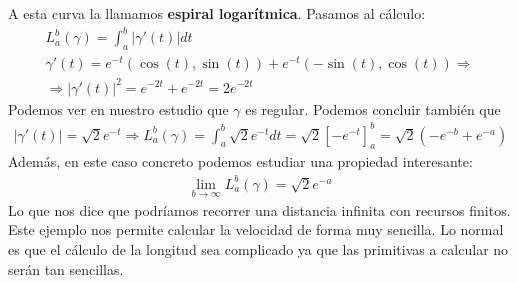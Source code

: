 \begin{ejemplo}
\begin{enumerate}
        A esta curva la llamamos \textbf{espiral logarítmica}. Pasamos al cálculo:
        \begin{gather*}
            L_a^b(\gamma) = \int_a^b |\gamma'(t)| dt\\
            \gamma'(t) = e^{-t}(\cos(t), \sin(t)) + e^{-t}(-\sin(t), \cos(t))\Rightarrow\\
            \Rightarrow |\gamma'(t)|^2 = e^{-2t}+e^{-2t} = 2e^{-2t}
        \end{gather*}
        Podemos ver en nuestro estudio que $\gamma$ es regular. Podemos concluir también que
        \begin{gather*}
            |\gamma'(t)| = \sqrt{2}e^{-t} \Rightarrow L_a^b(\gamma) = \int_a^b \sqrt{2}e^{-t} dt = \sqrt{2}[-e^{-t}]_a^b = \sqrt{2}(-e^{-b}+e^{-a})
        \end{gather*}
        Además, en este caso concreto podemos estudiar una propiedad interesante:
        \begin{gather*}
            \lim_{b\to \infty} L_a^b(\gamma) = \sqrt{2}e^{-a}
        \end{gather*}
        Lo que nos dice que podríamos recorrer una distancia infinita con recursos finitos. Este ejemplo nos permite calcular la velocidad de forma muy sencilla. Lo normal es que el cálculo de la longitud sea complicado ya que las primitivas a calcular no serán tan sencillas.
    \end{enumerate}
\end{ejemplo}



